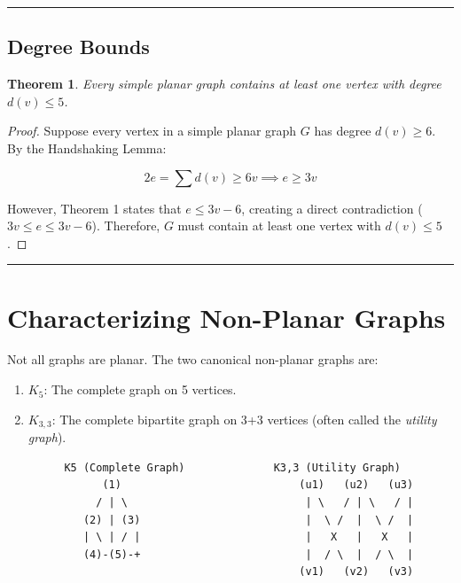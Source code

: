 \documentclass[
]{book}
\newtheorem{theorem}{Theorem}[chapter]
\theoremstyle{definition}
\theoremstyle{definition}
\theoremstyle{definition}
\theoremstyle{definition}
\theoremstyle{remark}
\begin{document}
\begin{center}\rule{0.5\linewidth}{0.5pt}\end{center}

\subsection{Degree Bounds}\label{degree-bounds}

\begin{theorem}
\protect\hypertarget{thm:unnamed-chunk-29}{}\label{thm:unnamed-chunk-29}Every simple planar graph contains at least one vertex with degree \(d(v) \le 5\).
\end{theorem}

\begin{proof}
Suppose every vertex in a simple planar graph \(G\) has degree \(d(v) \ge 6\).
By the Handshaking Lemma:

\[2e = \sum d(v) \ge 6v \implies e \ge 3v\]

However, Theorem 1 states that \(e \le 3v - 6\), creating a direct contradiction (\(3v \le e \le 3v - 6\)). Therefore, \(G\) must contain at least one vertex with \(d(v) \le 5\).
\end{proof}

\begin{center}\rule{0.5\linewidth}{0.5pt}\end{center}

\section{Characterizing Non-Planar Graphs}\label{characterizing-non-planar-graphs}

Not all graphs are planar. The two canonical non-planar graphs are:

\begin{enumerate}
\def\labelenumi{\arabic{enumi}.}
\item
  \textbf{\(K_5\)}: The complete graph on 5 vertices.
\item
  \textbf{\(K_{3,3}\)}: The complete bipartite graph on 3+3 vertices (often called the \emph{utility graph}).
\end{enumerate}

\begin{verbatim}
         K5 (Complete Graph)              K3,3 (Utility Graph)
               (1)                            (u1)   (u2)   (u3)
              / | \                            | \   / | \   / |
            (2) | (3)                          |  \ /  |  \ /  |
            | \ | / |                          |   X   |   X   |
            (4)-(5)-+                          |  / \  |  / \  |
                                              (v1)   (v2)   (v3)
\end{verbatim}
\end{document}
